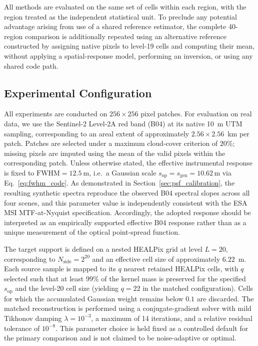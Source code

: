 \documentclass[journal]{IEEEtran}
\newcommand{\healpix}{HEALPix\xspace}
\newcommand{\utm}{UTM\xspace}
\begin{document}
All methods are evaluated on the same set of cells within each region, with the region treated as the independent statistical unit. To preclude any potential advantage arising from use of a shared reference estimator, the complete 40-region comparison is additionally repeated using an alternative reference constructed by assigning native pixels to level-19 cells and computing their mean, without applying a spatial-response model, performing an inversion, or using any shared code path.

\subsection{Experimental Configuration}
\label{sec:exp_config}

All experiments are conducted on $256\times256$ pixel patches. For evaluation on real data, we use the Sentinel-2 Level-2A red band (B04) at its native 10~m \utm sampling, corresponding to an areal extent of approximately $2.56\times2.56$~km per patch. Patches are selected under a maximum cloud-cover criterion of $20\%$; missing pixels are imputed using the mean of the valid pixels within the corresponding patch. Unless otherwise stated, the effective instrumental response is fixed to $\mathrm{FWHM}=12.5~\mathrm{m}$, i.e.\ a Gaussian scale $s_{\mathrm{op}}=s_{\mathrm{gen}}=10.62\,\mathrm{m}$ via Eq.~\eqref{eq:fwhm_code}. As demonstrated in Section~\ref{sec:psf_calibration}, the resulting synthetic spectra reproduce the observed B04 spectral slopes across all four scenes, and this parameter value is independently consistent with the ESA MSI MTF-at-Nyquist specification. Accordingly, the adopted response should be interpreted as an empirically supported effective B04 response rather than as a unique measurement of the optical point-spread function.

The target support is defined on a nested \healpix grid at level $L=20$, corresponding to $N_{\mathrm{side}}=2^{20}$ and an effective cell size of approximately $6.22$~m. Each source sample is mapped to its $q$ nearest retained \healpix cells, with $q$ selected such that at least $99\%$ of the kernel mass is preserved for the specified $s_{\mathrm{op}}$ and the level-20 cell size (yielding $q=22$ in the matched configuration). Cells for which the accumulated Gaussian weight remains below $0.1$ are discarded. The matched reconstruction is performed using a conjugate-gradient solver with mild Tikhonov damping $\lambda=10^{-3}$, a maximum of 14 iterations, and a relative residual tolerance of $10^{-8}$. This parameter choice is held fixed as a controlled default for the primary comparison and is not claimed to be noise-adaptive or optimal.
\end{document}
